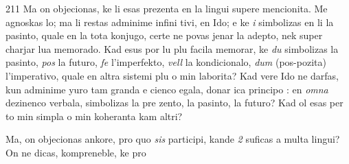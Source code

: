 \begin{VUpage}[215]{211}
Ma on objecionas, ke li esas prezenta en la lingui supere\nl
mencionita. Me agnoskas lo; ma li restas adminime infini\cc
tivi, en Ido; e ke \textit{i} simbolizas en li la pasinto, quale en la\nl
tota konjugo, certe ne povas jenar la adepto, nek super\cc
charjar lua memorado. Kad esus por lu plu facila memorar,\nl
ke \textit{du} simbolizas la pasinto, \textit{pos} la futuro, \textit{fe} l'imperfekto,\nl
\textit{vell} la kondicionalo, \textit{dum} (pos-pozita) l'imperativo, quale\nl
en altra sistemi plu o min laborita? Kad vere Ido ne darfas,\nl
kun adminime yuro tam granda e cienco egala, donar ica\nl
principo : en \textit{omna} dezinenco verbala,  simbolizas la pre\cc
zento,  la pasinto,  la futuro? Kad ol esas per to min\nl
simpla o min koheranta kam altri?

Ma, on objecionas ankore, pro quo \textit{sis} participi, kande\nl
\textit{2} suficas a multa lingui? On ne dicas, kompreneble, ke pro\parplein
\end{VUpage}

